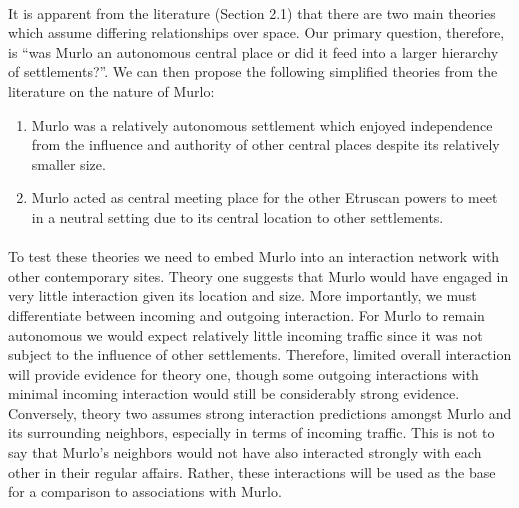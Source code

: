 \documentclass[12pt,a4paper]{thesis}
\begin{document}
\paragraph{}
It is apparent from the literature (Section 2.1) that there are two main theories which assume differing relationships over space. Our primary question, therefore, is ``was Murlo an autonomous central place or did it feed into a larger hierarchy of settlements?''. We can then propose the following simplified theories from the literature on the nature of Murlo:
	
	\begin{enumerate}
	\item Murlo was a relatively autonomous settlement which enjoyed independence from the influence and authority of other central places despite its relatively smaller size.
	\item Murlo acted as central meeting place for the other Etruscan powers to meet in a neutral setting due to its central location to other settlements. 
	\end{enumerate}

\paragraph{}
To test these theories we need to embed Murlo into an interaction network with other contemporary sites. Theory one suggests that Murlo would have engaged in very little interaction given its location and size. More importantly, we must differentiate between incoming and outgoing interaction. For Murlo to remain autonomous we would expect relatively little incoming traffic since it was not subject to the influence of other settlements. Therefore, limited overall interaction will provide evidence for theory one, though some outgoing interactions with minimal incoming interaction would still be considerably strong evidence. Conversely, theory two assumes strong interaction predictions amongst Murlo and its surrounding neighbors, especially in terms of incoming traffic. This is not to say that Murlo's neighbors would not have also interacted strongly with each other in their regular affairs. Rather, these interactions will be used as the base for a comparison to associations with Murlo.
\end{document}
